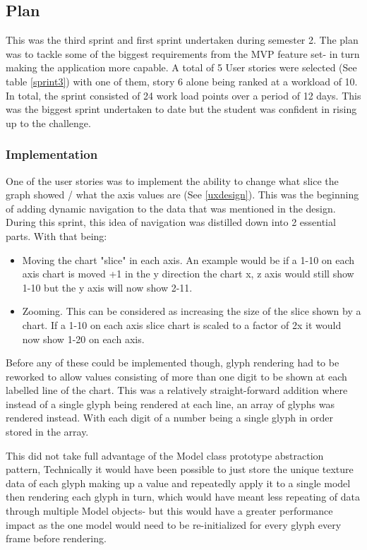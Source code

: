 \subsection{Plan}
This was the third sprint and first sprint undertaken during semester 2. The plan was to tackle some of the biggest requirements from the MVP feature set- in turn making the application more capable. A total of 5 User stories were selected (See table \ref{sprint3}) with one of them, story 6 alone being ranked at a workload of 10. In total, the sprint consisted of 24 work load points over a period of 12 days. This was the biggest sprint undertaken to date but the student was confident in rising up to the challenge.

\subsubsection{Implementation}

One of the user stories was to implement the ability to change what slice the graph showed / what the axis values are (See \ref{uxdesign}). This was the beginning of adding dynamic navigation to the data that was mentioned in the design. During this sprint, this idea of navigation was distilled down into 2 essential parts. With that being:
\begin{itemize}
    \item Moving the chart "slice" in each axis. An example would be if a 1-10 on each axis chart is moved +1 in the y direction the chart x, z axis would still show 1-10 but the y axis will now show 2-11.
    \item Zooming. This can be considered as increasing the size of the slice shown by a chart. If a 1-10 on each axis slice chart is scaled to a factor of 2x it would now show 1-20 on each axis.
\end{itemize}

Before any of these could be implemented though, glyph rendering had to be reworked to allow values consisting of more than one digit to be shown at each labelled line of the chart. This was a relatively straight-forward addition where instead of a single glyph being rendered at each line, an array of glyphs was rendered instead. With each digit of a number being a single glyph in order stored in the array.

This did not take full advantage of the Model class prototype abstraction pattern, Technically it would have been possible to just store the unique texture data of each glyph making up a value and repeatedly apply it to a single model then rendering each glyph in turn, which would have meant less repeating of data through multiple Model objects- but this would have a greater performance impact as the one model would need to be re-initialized for every glyph every frame before rendering.

